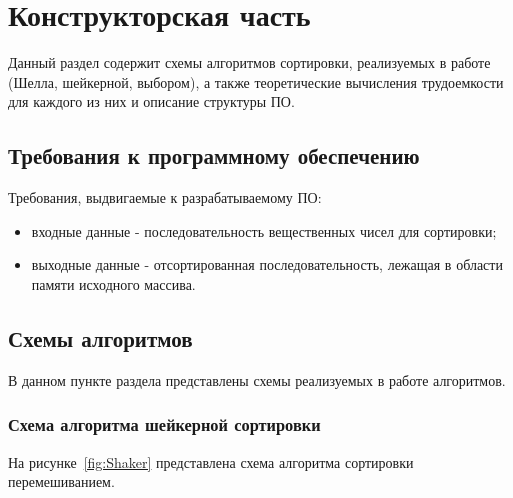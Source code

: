 \documentclass[12pt]{report}
\begin{document}
    \newpage


    \chapter{Конструкторская часть}
    Данный раздел содержит схемы алгоритмов сортировки, реализуемых в работе (Шелла, шейкерной, выбором),
    а также теоретические вычисления трудоемкости для каждого из них
    и описание структуры ПО.


    \section{Требования к программному обеспечению}
    Требования, выдвигаемые к разрабатываемому ПО:
    \begin{itemize}
        \item входные данные - последовательность вещественных чисел для сортировки;
        \item выходные данные - отсортированная последовательность, лежащая в области памяти исходного массива.
    \end{itemize}


    \section{Схемы алгоритмов}
    В данном пункте раздела представлены схемы реализуемых в работе алгоритмов.

    \subsection{Схема алгоритма шейкерной сортировки}
    На рисунке~\ref{fig:Shaker} представлена схема алгоритма сортировки перемешиванием.
\end{document}
